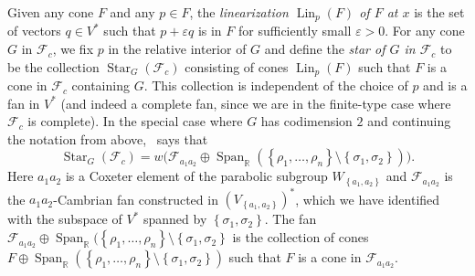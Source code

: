 \documentclass[ALCO,ThmDefs,Unicode,epreuves]{cedram}
\DeclareMathOperator{\Star}{Star}
\DeclareMathOperator{\Lin}{Lin}
\DeclareMathOperator{\Span}{Span}
\newcommand{\newword}[1]{\emph{#1}}
\newcommand{\reals}{\mathbb R}
\newcommand{\ep}{\varepsilon}
\newcommand{\set}[1]{{\left\lbrace #1 \right\rbrace}}
\newcommand{\F}{{\mathcal F}}
\begin{document}
Given any cone $F$ and any $p\in F$, the \newword{linearization $\Lin_p(F)$ of $F$ at $x$} is the set of vectors $q\in V^*$ such that $p+\ep q$ is in $F$ for sufficiently small $\ep>0$.
For any cone $G$ in $\F_c$, we fix $p$ in the relative interior of $G$ and define the \newword{star of $G$ in $\F_c$} to be the collection $\Star_G(\F_c)$ consisting of cones $\Lin_p(F)$ such that $F$ is a cone in $\F_c$ containing $G$.
This collection is independent of the choice of $p$ and is a fan in $V^*$ (and indeed a complete fan, since we are in the finite-type case where $\F_c$ is complete).
In the special case where $G$ has codimension $2$ and continuing the notation from above,~\cite[Theorem~9.8]{typefree} says that 
\begin{equation}\label{9.8}
\Star_G(\F_c)=w\bigl(\F_{a_1a_2}\oplus\Span_\reals(\set{\rho_1,\ldots,\rho_n}\setminus\set{\sigma_1,\sigma_2})\bigr).
\end{equation}
Here $a_1a_2$ is a Coxeter element of the parabolic subgroup $W_{\set{a_1,a_2}}$ and $\F_{a_1a_2}$ is the $a_1a_2$-Cambrian fan constructed in $(V_{\set{a_1,a_2}})^*$, which we have identified with the subspace of $V^*$ spanned by $\set{\sigma_1,\sigma_2}$.
The fan $\F_{a_1a_2}\oplus\Span_\reals(\set{\rho_1,\ldots,\rho_n}\setminus\set{\sigma_1,\sigma_2}$ is the collection of cones $F\oplus\Span_\reals(\set{\rho_1,\ldots,\rho_n}\setminus\set{\sigma_1,\sigma_2})$ such that $F$ is a cone in $\F_{a_1a_2}$.
\end{document}
